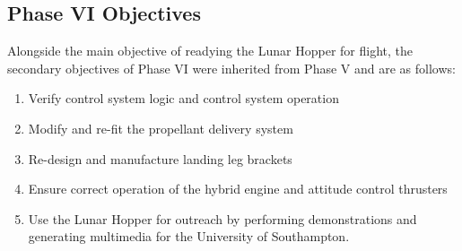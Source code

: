 \documentclass[12pt]{article}
\begin{document}
\subsection{Phase VI Objectives}

Alongside the main objective of readying the Lunar Hopper for flight, the secondary objectives of Phase VI were inherited from Phase V and are as follows:

\begin{enumerate}

\item Verify control system logic and control system operation
\item Modify and re-fit the propellant delivery system
\item Re-design and manufacture landing leg brackets
\item Ensure correct operation of the hybrid engine and attitude control thrusters
\item Use the Lunar Hopper for outreach by performing demonstrations and generating multimedia for the University of Southampton.

\end{enumerate}
\end{document}
